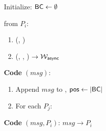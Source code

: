 \begin{bbox}[title={$\mathcal{F}_\msf{Atomic}$}]

Initialize: ${\mathsf {BC}} \leftarrow \emptyset$

\OnInput {} from $P_i$:
	\begin{enumerate}
		\item \Leak (, \Partyi)

		\item \Send (\Schedule, , ) $\rightarrow \mathcal{W}_{{\mathsf {async}}}$

	\end{enumerate}
   
{\color{Blue} {\bf Code}  $(msg)$:}

	\begin{enumerate}
		\item {\color{Blue} Append $msg$ to , ${\mathsf {pos}} \leftarrow |{\mathsf {BC}}|$}

		\item {\color{Blue} For each $P_j$:}


		
    \end{enumerate}

{\color{Red} {\bf Code}  $(msg, P_i)$: \Send $msg \rightarrow P_i$ }


\end{bbox}
